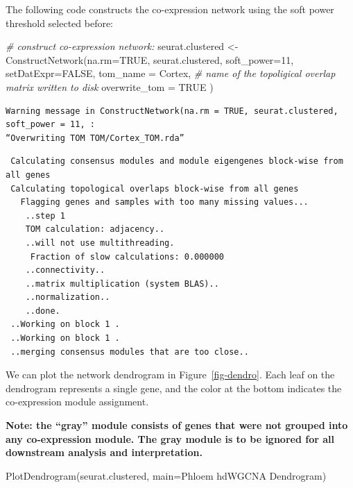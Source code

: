 \documentclass[
  letterpaper,
  DIV=11,
  numbers=noendperiod]{scrartcl}
\newenvironment{Shaded}{}{}
\newcommand{\AttributeTok}[1]{\textcolor[rgb]{0.49,0.56,0.16}{#1}}
\newcommand{\CommentTok}[1]{\textcolor[rgb]{0.38,0.63,0.69}{\textit{#1}}}
\newcommand{\ConstantTok}[1]{\textcolor[rgb]{0.53,0.00,0.00}{#1}}
\newcommand{\DecValTok}[1]{\textcolor[rgb]{0.25,0.63,0.44}{#1}}
\newcommand{\FunctionTok}[1]{\textcolor[rgb]{0.02,0.16,0.49}{#1}}
\newcommand{\NormalTok}[1]{#1}
\newcommand{\OtherTok}[1]{\textcolor[rgb]{0.00,0.44,0.13}{#1}}
\newcommand{\StringTok}[1]{\textcolor[rgb]{0.25,0.44,0.63}{#1}}
\begin{document}
The following code constructs the co-expression network using the soft
power threshold selected before:

\begin{Shaded}
\begin{Highlighting}[]
\CommentTok{\# construct co{-}expression network:}
\NormalTok{seurat.clustered }\OtherTok{\textless{}{-}} \FunctionTok{ConstructNetwork}\NormalTok{(}\AttributeTok{na.rm=}\ConstantTok{TRUE}\NormalTok{,}
\NormalTok{  seurat.clustered,}
  \AttributeTok{soft\_power=}\DecValTok{11}\NormalTok{,                                   }
  \AttributeTok{setDatExpr=}\ConstantTok{FALSE}\NormalTok{,}
  \AttributeTok{tom\_name =} \StringTok{\textquotesingle{}Cortex\textquotesingle{}}\NormalTok{, }\CommentTok{\# name of the topoligical overlap matrix written to disk}
  \AttributeTok{overwrite\_tom =} \ConstantTok{TRUE}
\NormalTok{)}
\end{Highlighting}
\end{Shaded}

\begin{verbatim}
Warning message in ConstructNetwork(na.rm = TRUE, seurat.clustered, soft_power = 11, :
“Overwriting TOM TOM/Cortex_TOM.rda”
\end{verbatim}

\begin{verbatim}
 Calculating consensus modules and module eigengenes block-wise from all genes
 Calculating topological overlaps block-wise from all genes
   Flagging genes and samples with too many missing values...
    ..step 1
    TOM calculation: adjacency..
    ..will not use multithreading.
     Fraction of slow calculations: 0.000000
    ..connectivity..
    ..matrix multiplication (system BLAS)..
    ..normalization..
    ..done.
 ..Working on block 1 .
 ..Working on block 1 .
 ..merging consensus modules that are too close..
\end{verbatim}

We can plot the network dendrogram in Figure~\ref{fig-dendro}. Each leaf
on the dendrogram represents a single gene, and the color at the bottom
indicates the co-expression module assignment.

\textbf{Note: the ``gray'' module consists of genes that were not
grouped into any co-expression module. The gray module is to be ignored
for all downstream analysis and interpretation.}

\begin{Shaded}
\begin{Highlighting}[]
\FunctionTok{PlotDendrogram}\NormalTok{(seurat.clustered, }\AttributeTok{main=}\StringTok{\textquotesingle{}Phloem hdWGCNA Dendrogram\textquotesingle{}}\NormalTok{)}
\end{Highlighting}
\end{Shaded}
\end{document}
